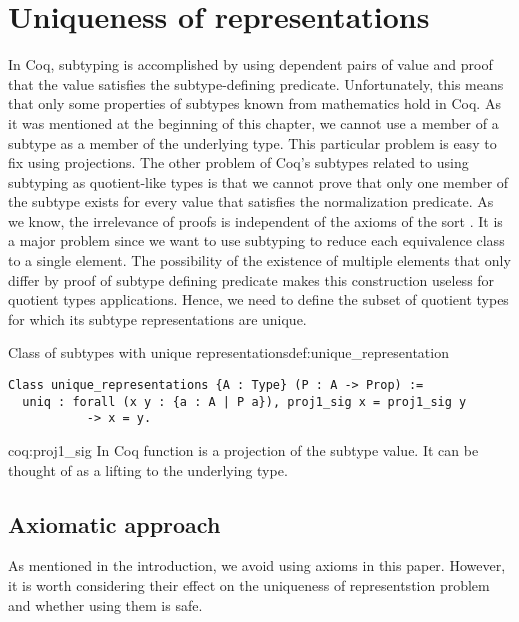 \section{Uniqueness of representations}
In Coq, subtyping is accomplished by using dependent pairs of value and proof that the value satisfies the subtype-defining predicate. Unfortunately, this means that only some properties of subtypes known from mathematics hold in Coq. As it was mentioned at the beginning of this chapter, we cannot use a member of a subtype as a member of the underlying type. This particular problem is easy to fix using projections. The other problem of Coq's subtypes related to using subtyping as quotient-like types is that we cannot prove that only one member of the subtype exists for every value that satisfies the normalization predicate. As we know, the irrelevance of proofs is independent of the axioms of the  sort \cite{CoqBook2}. It is a major problem since we want to use subtyping to reduce each equivalence class to a single element. The possibility of the existence of multiple elements that only differ by proof of subtype defining predicate makes this construction useless for quotient types applications. Hence, we need to define the subset of quotient types for which its subtype representations are unique.
\begin{defi}{Class of subtypes with unique representations}{def:unique_representation}
\begin{verbatim}
Class unique_representations {A : Type} (P : A -> Prop) := 
  uniq : forall (x y : {a : A | P a}), proj1_sig x = proj1_sig y 
           -> x = y.
\end{verbatim}
\end{defi}
\begin{coq}{}{coq:proj1_sig}
In Coq function  is a projection of the subtype value. It can be thought of as a lifting to the underlying type.
\end{coq}
\subsection{Axiomatic approach}
As mentioned in the introduction, we avoid using axioms in this paper. However, it is worth considering their effect on the uniqueness of representstion problem and whether using them is safe.
